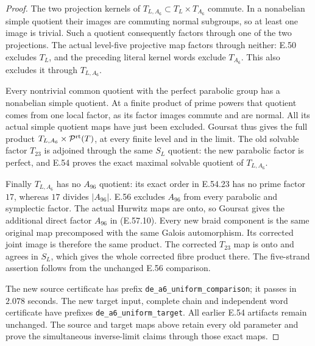 \begin{proof}
The two projection kernels of
$T_{L,A_6}\subset T_L\times T_{A_6}$
commute.  In a nonabelian simple quotient
their images are commuting normal
subgroups, so at least one image is
trivial.  Such a quotient consequently
factors through one of the two projections.
The actual level-five projective map
factors through neither: E.50 excludes
$T_L$, and the preceding literal kernel
words exclude $T_{A_6}$.
This also excludes it through
$T_{L,A_6}$.

Every nontrivial common quotient with
the perfect parabolic group has a
nonabelian simple quotient.  At a finite
product of prime powers that quotient
comes from one local factor, as its
factor images commute and are normal.
All its actual simple quotient maps
have just been excluded.  Goursat thus
gives the full product
$T_{L,A_6}\times\mathcal P^{\rm rt}(T)$,
at every finite level and in the limit.
The old solvable factor $T_{23}$ is
adjoined through the same $S_L$ quotient:
the new parabolic factor is perfect,
and E.54 proves the exact maximal
solvable quotient of $T_{L,A_6}$.

Finally $T_{L,A_6}$ has no $A_{96}$
quotient: its exact order in E.54.23
has no prime factor $17$, whereas
$17$ divides $|A_{96}|$.
E.56 excludes $A_{96}$ from every
parabolic and symplectic factor.
The actual Hurwitz maps are onto,
so Goursat gives the additional
direct factor $A_{96}$ in
\textup{(E.57.10)}.  Every new braid
component is the same original map
precomposed with the same Galois
automorphism.  Its corrected joint
image is therefore the same product.
The corrected $T_{23}$ map is onto
and agrees in $S_L$, which gives the
whole corrected fibre product there.
The five-strand assertion follows
from the unchanged E.56 comparison.

The new source certificate has prefix
\texttt{de\_a6\_uniform\_comparison}; it
passes in $2.078$ seconds.  The new
target input, complete chain and
independent word certificate have
prefixes \texttt{de\_a6\_uniform\_target}.
All earlier E.54 artifacts remain
unchanged.  The source and target
maps above retain every old parameter
and prove the simultaneous inverse-limit
claims through those exact maps.
\end{proof}
